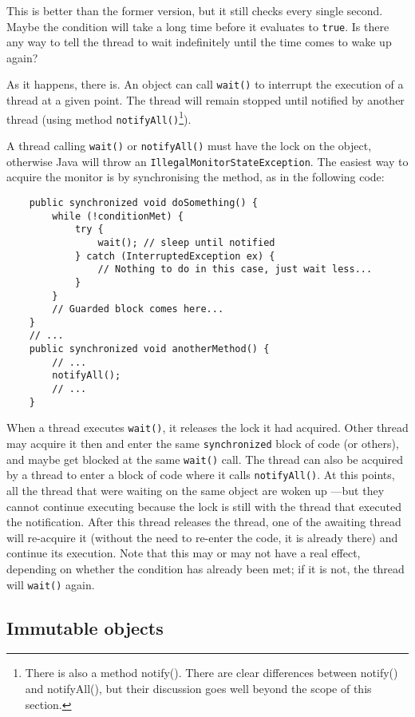 This is better than the former version, but it still checks every
single second. Maybe the condition will take a long time before it
evaluates to \verb+true+. Is there any way to tell the thread to wait
indefinitely until the time comes to wake up again? 

As it happens, there is. An object can call \verb+wait()+ to interrupt
the execution of a thread at a given point. The thread will remain
stopped until notified by another thread (using method
\verb+notifyAll()+\footnote{There is also a method notify(). There are
clear differences between notify() and notifyAll(), but their
discussion goes well beyond the scope of this section.}). 

A thread calling \verb+wait()+ or \verb+notifyAll()+ must have the
lock on the object, otherwise Java will throw an
\verb+IllegalMonitorStateException+. The easiest way to acquire the
monitor is by synchronising the method, as in the following code: 

\begin{verbatim}
    public synchronized void doSomething() {
        while (!conditionMet) {
            try {
                wait(); // sleep until notified
            } catch (InterruptedException ex) {
                // Nothing to do in this case, just wait less...
            }
        }  
        // Guarded block comes here...
    }
    // ...
    public synchronized void anotherMethod() {
        // ...
        notifyAll();
        // ...
    }
\end{verbatim}

When a thread executes \verb+wait()+, it releases the lock it had
acquired. Other thread may acquire it then and enter the same
\verb+synchronized+ block of code (or others), and maybe get blocked
at the same \verb+wait()+ call. The thread can also be acquired by a
thread to enter a block of code where it calls \verb+notifyAll()+. At
this points, all the thread that were waiting on the same object are
woken up ---but they cannot continue executing because the lock is
still with the thread that executed the notification. After this
thread releases the thread, one of the awaiting thread will re-acquire
it (without the need to re-enter the code, it is already there) and
continue its execution. Note that this may or may not have a real
effect, depending on whether the condition has already been met; if it
is not, the thread will \verb+wait()+ again. 

\subsection{Immutable objects}
\label{sec:immutable-objects}


